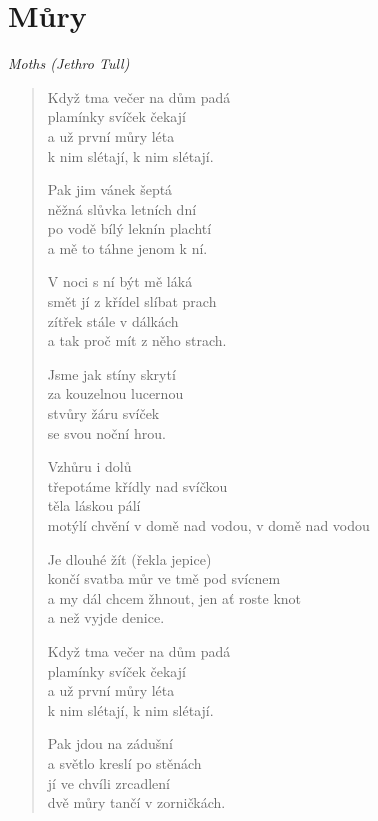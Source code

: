 \section*{Můry}

\textit{Moths (Jethro Tull)}

\begin{verse}
	
Když tma večer na dům padá \\
plamínky svíček čekají \\
a už první můry léta \\
k nim slétají, k nim slétají.

Pak jim vánek šeptá\\
něžná slůvka letních dní \\
po vodě bílý leknín plachtí\\
a mě to táhne jenom k ní.

V noci s ní být mě láká \\
smět jí z křídel slíbat prach \\
zítřek stále v dálkách \\
a tak proč mít z něho strach.

Jsme jak stíny skrytí \\
za kouzelnou lucernou \\
stvůry žáru svíček \\
se svou noční hrou.

Vzhůru i dolů \\
třepotáme křídly nad svíčkou \\
těla láskou pálí \\
motýlí chvění v domě nad vodou, v domě nad vodou

Je dlouhé žít (řekla jepice) \\
končí svatba můr ve tmě pod svícnem \\
a my dál chcem žhnout, jen ať roste knot \\
a než vyjde denice.

Když tma večer na dům padá \\
plamínky svíček čekají \\
a už první můry léta \\
k nim slétají, k nim slétají.

Pak jdou na zádušní \\
a světlo kreslí po stěnách \\
jí ve chvíli zrcadlení \\
dvě můry tančí v zorničkách.
\end{verse}
